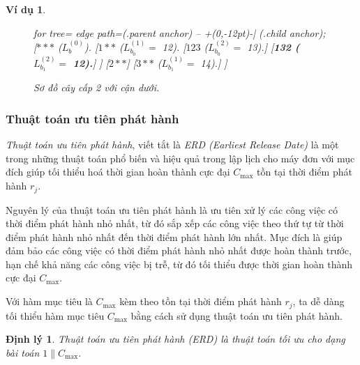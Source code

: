 \documentclass[12pt,a4paper]{report}
\newtheorem{dl}{Định lý}
\newtheorem{vd}{Ví dụ}
\begin{document}
\begin{vd}
\begin{figure}[h!]
	\centering
	\begin{forest} for tree={
		edge path={\noexpand{} (.parent anchor) -- +(0,-12pt)-| (.child anchor);}
	}
	[{$***$ ($L_b^{(0)}$).}
		[{$1**$ ($L_{b_0}^{(1)} =$ 12).}
			[{$123$ ($L_{b_0}^{(2)} =$ 13).}]
			[{\textbf{132 ($L_{b_1}^{(2)} =$ 12).}}]
		]
		[$2**$]
		[{$3**$ ($L_{b_1}^{(1)} =$ 14).}]
	]
	\end{forest}
\caption{\label{vdcmaxcap2canduoi} Sơ đồ cây cấp 2 với cận dưới.}
\end{figure}

\end{vd}

\phantom{text}

\subsubsection*{Thuật toán ưu tiên phát hành}

\textit{Thuật toán ưu tiên phát hành}, viết tắt là \textit{ERD (Earliest Release Date)} là một trong những thuật toán phổ biến và hiệu quả trong lập lịch cho máy đơn với mục đích giúp tối thiểu hoá thời gian hoàn thành cực đại $C_{\max}$ tồn tại thời điểm phát hành $r_j$.

Nguyên lý của thuật toán ưu tiên phát hành là ưu tiên xử lý các công việc có thời điểm phát hành nhỏ nhất, từ đó sắp xếp các công việc theo thứ tự từ thời điểm phát hành nhỏ nhất đến thời điểm phát hành lớn nhất. Mục đích là giúp đảm bảo các công việc có thời điểm phát hành nhỏ nhất được hoàn thành trước, hạn chế khả năng các công việc bị trễ, từ đó tối thiểu được thời gian hoàn thành cực đại $C_{\max}$.

Với hàm mục tiêu là $C_{\max}$ kèm theo tồn tại thời điểm phát hành $r_j$, ta dễ dàng tối thiểu hàm mục tiêu $C_{\max}$ bằng cách sử dụng thuật toán ưu tiên phát hành.

\begin{dl}
	Thuật toán ưu tiên phát hành (ERD) là thuật toán tối ưu cho dạng bài toán $1 \| C_{\max}$.
\end{dl}
\end{document}

